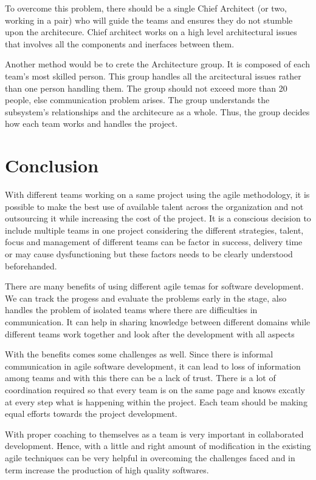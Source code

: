 \documentclass[sigconf]{acmart}
\begin{document}
To overcome this problem, there should be a single Chief Architect (or two, working in a pair) who will guide the teams and ensures they do not stumble upon the architecure. Chief architect works on a high level architectural issues that involves all the components and inerfaces between them. 


Another method would be to crete the Architecture group. It is composed of each team's most skilled person. This group handles all the arcitectural issues rather than one person handling them. The group should not exceed more than 20 people, else communication problem arises. The group understands the subsystem's relationships and the architecure as a whole. Thus, the group decides how each team works and handles the project. 


\section{Conclusion}
With different teams working on a same project using the agile methodology, it is possible to make the best use of available talent across the organization and not outsourcing it while increasing the cost of the project. It is a conscious decision to include multiple teams in one project considering the different strategies, talent, focus and management of different teams can be factor in success, delivery time or may cause dysfunctioning but these factors needs to be clearly understood beforehanded.

There are many benefits of using different agile temas for software development. We can track the progess and evaluate the problems early in the stage, also handles the problem of isolated teams where there are difficulties in communication. It can help in sharing knowledge between different domains while different teams work together and look after the development with all aspects

With the benefits comes some challenges as well. Since there is informal communication in agile software development, it can lead to loss of information among teams and with this there can be a lack of trust. There is a lot of coordination required so that every team is on the same page and knows excatly at every step what is happening within the project. Each team should be making equal efforts towards the project development.

With proper coaching to themselves as a team is very important in collaborated development\cite{4638656}. Hence, with a little and right amount of modification in the existing agile techniques can be very helpful in overcoming the challenges faced and in term increase the production of high quality softwares.



% 
%
\end{document}
